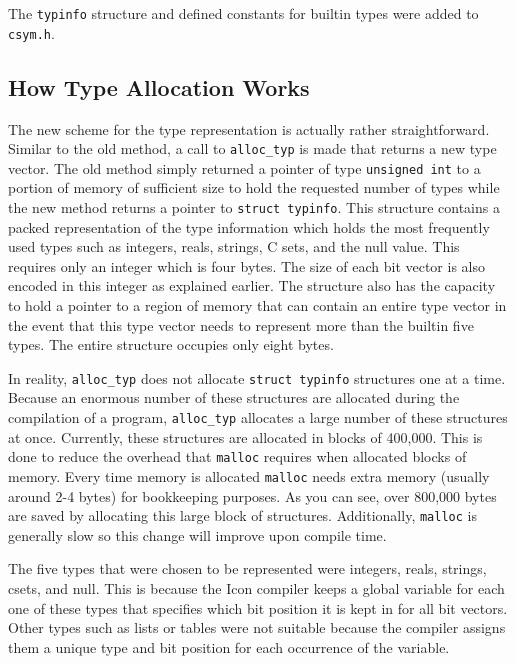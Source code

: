 The \texttt{typinfo} structure and defined constants for builtin types
were added to \texttt{csym.h}.

\subsection{How Type Allocation Works}

The new scheme for the type representation is actually rather
straightforward. Similar to the old method, a call to
\texttt{alloc\_typ} is made that returns a new type vector. The old
method simply returned a pointer of type \texttt{unsigned int} to a
portion of memory of sufficient size to hold the requested number of
types while the new method returns a pointer to \texttt{struct
typinfo}. This structure contains a packed representation of the type
information which holds the most frequently used types such as
integers, reals, strings, C sets, and the null value. This requires
only an integer which is four bytes. The size of each bit vector is
also encoded in this integer as explained earlier. The structure also
has the capacity to hold a pointer to a region of memory that can
contain an entire type vector in the event that this type vector needs
to represent more than the builtin five types. The entire structure
occupies only eight bytes.

In reality, \texttt{alloc\_typ} does not allocate \texttt{struct
typinfo} structures one at a time. Because an enormous number of these
structures are allocated during the compilation of a program,
\texttt{alloc\_typ} allocates a large number of these structures at
once. Currently, these structures are allocated in blocks of
400,000. This is done to reduce the overhead that \texttt{malloc}
requires when allocated blocks of memory. Every time memory is
allocated \texttt{malloc} needs extra memory (usually around 2-4
bytes) for bookkeeping purposes. As you can see, over 800,000 bytes
are saved by allocating this large block of structures. Additionally,
\texttt{malloc} is generally slow so this change will improve upon
compile time.

The five types that were chosen to be represented were integers,
reals, strings, csets, and null. This is because the Icon compiler
keeps a global variable for each one of these types that specifies
which bit position it is kept in for all bit vectors. Other types such
as lists or tables were not suitable because the compiler assigns them
a unique type and bit position for each occurrence of the variable.

